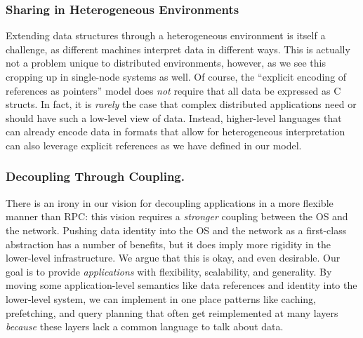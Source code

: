     \subsubsection{Sharing in Heterogeneous Environments}

    Extending data structures through a heterogeneous environment is itself a challenge, as different
    machines interpret data in different ways. This is actually not a problem unique to distributed
    environments, however, as we see this cropping up in single-node systems as well. Of course, the
    ``explicit encoding of references as pointers'' model does \emph{not} require that all data be
    expressed as C structs. In fact, it is \emph{rarely} the case that complex distributed applications
    need or should have such a low-level view of data. Instead, higher-level languages that can already
    encode data in formats that allow for heterogeneous interpretation can also leverage explicit
    references as we have defined in our model.


    \subsubsection{Decoupling Through Coupling.}
    There is an irony in our vision for decoupling applications in a more
    flexible manner than RPC: this vision requires a \emph{stronger}
    coupling between the OS and the network.
    Pushing data identity into the OS and the network as a first-class
    abstraction has a number of benefits, but it does imply more rigidity
    in the lower-level infrastructure. We argue that this is okay, and even desirable. Our
    goal is to provide \emph{applications} with flexibility, scalability,
    and generality. By moving some application-level semantics
    like data references and identity into the lower-level system, we
    can implement in one place patterns like caching, prefetching, and
    query planning that often get reimplemented at many layers
    \emph{because} these layers lack a common language to
    talk about data.



